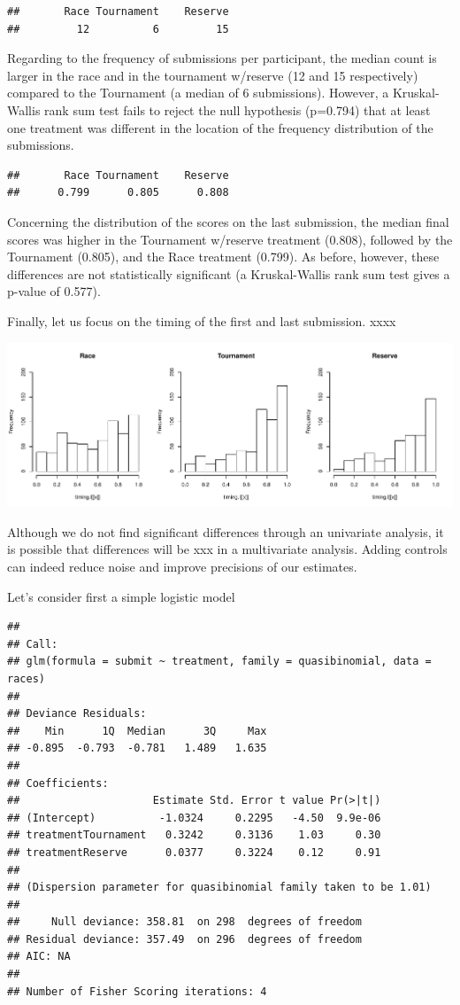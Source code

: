\documentclass[12pt,]{article}
\begin{document}
\begin{verbatim}
##       Race Tournament    Reserve 
##         12          6         15
\end{verbatim}

Regarding to the frequency of submissions per participant, the median
count is larger in the race and in the tournament w/reserve (12 and 15
respectively) compared to the Tournament (a median of 6 submissions).
However, a Kruskal-Wallis rank sum test fails to reject the null
hypothesis (p=0.794) that at least one treatment was different in the
location of the frequency distribution of the submissions.

\begin{verbatim}
##       Race Tournament    Reserve 
##      0.799      0.805      0.808
\end{verbatim}

Concerning the distribution of the scores on the last submission, the
median final scores was higher in the Tournament w/reserve treatment
(0.808), followed by the Tournament (0.805), and the Race treatment
(0.799). As before, however, these differences are not statistically
significant (a Kruskal-Wallis rank sum test gives a p-value of 0.577).

Finally, let us focus on the timing of the first and last submission.
xxxx

\includegraphics{Figures/unnamed-chunk-17-1.pdf}

Although we do not find significant differences through an univariate
analysis, it is possible that differences will be xxx in a multivariate
analysis. Adding controls can indeed reduce noise and improve precisions
of our estimates.

Let's consider first a simple logistic model

\begin{verbatim}
## 
## Call:
## glm(formula = submit ~ treatment, family = quasibinomial, data = races)
## 
## Deviance Residuals: 
##    Min      1Q  Median      3Q     Max  
## -0.895  -0.793  -0.781   1.489   1.635  
## 
## Coefficients:
##                     Estimate Std. Error t value Pr(>|t|)
## (Intercept)          -1.0324     0.2295   -4.50  9.9e-06
## treatmentTournament   0.3242     0.3136    1.03     0.30
## treatmentReserve      0.0377     0.3224    0.12     0.91
## 
## (Dispersion parameter for quasibinomial family taken to be 1.01)
## 
##     Null deviance: 358.81  on 298  degrees of freedom
## Residual deviance: 357.49  on 296  degrees of freedom
## AIC: NA
## 
## Number of Fisher Scoring iterations: 4
\end{verbatim}
\end{document}
